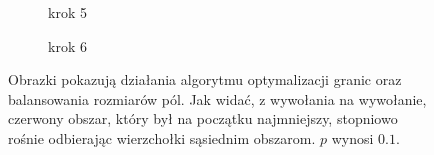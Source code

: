 \begin{figure}[h]
\begin{subfigure}{.5\textwidth}
    \centering
    \caption[short]{krok 5}
\end{subfigure}
\begin{subfigure}{.5\textwidth}
    \centering
    \caption[short]{krok 6}
\end{subfigure}%
\caption{Obrazki pokazują działania algorytmu optymalizacji granic oraz balansowania rozmiarów pól. Jak widać, z wywołania
na wywołanie, czerwony obszar, który był na początku najmniejszy, stopniowo rośnie odbierając wierzchołki sąsiednim
obszarom. $p$ wynosi $0.1$.}
\label{im:fields_balancing}
\end{figure}


